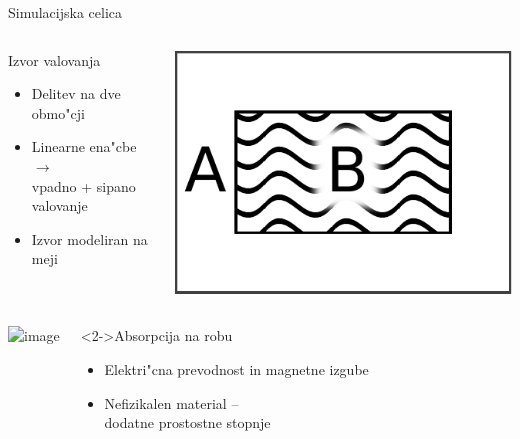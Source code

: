 \documentclass{beamer}
\begin{document}
\begin{frame}{Simulacijska celica}
\begin{columns}
 
 
 \begin{block}{Izvor valovanja}
 \begin{itemize}
  \item Delitev na dve obmo"cji
  \item Linearne ena"cbe $\rightarrow$ \\ vpadno + sipano valovanje
  \item Izvor modeliran na meji
 \end{itemize}
 \end{block}

 \begin{center}
 \includegraphics[width=.8\textwidth]{./Slike/wave-source-regions-one}
 \end{center}
 \end{columns}
 \begin{columns}


 \begin{center}
 \includegraphics<2->[width=.9\textwidth]{./Slike/celica}
 \end{center}


 \begin{block}<2->{Absorpcija na robu}
  \begin{itemize}
   \item Elektri"cna prevodnost in magnetne izgube
   \item Nefizikalen material -- \\ dodatne prostostne stopnje
  \end{itemize}
 \end{block}
 

\end{columns}
\end{frame}
\end{document}
